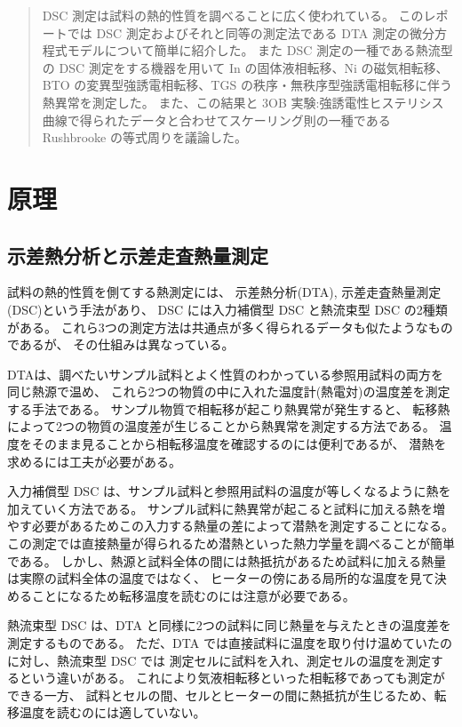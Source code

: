 \documentclass[9pt,dvipdfmx,a4paper]{jsarticle}
\begin{document}

\begin{abstract}
    DSC 測定は試料の熱的性質を調べることに広く使われている。
    このレポートでは DSC 測定およびそれと同等の測定法である DTA 測定の微分方程式モデルについて簡単に紹介した。
    また DSC 測定の一種である熱流型の DSC 測定をする機器を用いて In の固体液相転移、Ni の磁気相転移、
    BTO の変異型強誘電相転移、TGS の秩序・無秩序型強誘電相転移に伴う熱異常を測定した。
    また、この結果と 3OB 実験:強誘電性ヒステリシス曲線で得られたデータと合わせてスケーリング則の一種である Rushbrooke の等式周りを議論した。
\end{abstract}


\section{原理}
\subsection{示差熱分析と示差走査熱量測定}
試料の熱的性質を側てする熱測定には、
示差熱分析(DTA), 示差走査熱量測定(DSC)という手法があり、
DSC には入力補償型 DSC と熱流束型 DSC の2種類がある。
これら3つの測定方法は共通点が多く得られるデータも似たようなものであるが、
その仕組みは異なっている。

DTAは、調べたいサンプル試料とよく性質のわかっている参照用試料の両方を同じ熱源で温め、
これら2つの物質の中に入れた温度計(熱電対)の温度差を測定する手法である。
サンプル物質で相転移が起こり熱異常が発生すると、
転移熱によって2つの物質の温度差が生じることから熱異常を測定する方法である。
温度をそのまま見ることから相転移温度を確認するのには便利であるが、
潜熱を求めるには工夫が必要がある。

入力補償型 DSC は、サンプル試料と参照用試料の温度が等しくなるように熱を加えていく方法である。
サンプル試料に熱異常が起こると試料に加える熱を増やす必要があるためこの入力する熱量の差によって潜熱を測定することになる。
この測定では直接熱量が得られるため潜熱といった熱力学量を調べることが簡単である。
しかし、熱源と試料全体の間には熱抵抗があるため試料に加える熱量は実際の試料全体の温度ではなく、
ヒーターの傍にある局所的な温度を見て決めることになるため転移温度を読むのには注意が必要である。

熱流束型 DSC は、DTA と同様に2つの試料に同じ熱量を与えたときの温度差を測定するものである。
ただ、DTA では直接試料に温度を取り付け温めていたのに対し、熱流束型 DSC では
測定セルに試料を入れ、測定セルの温度を測定するという違いがある。
これにより気液相転移といった相転移であっても測定ができる一方、
試料とセルの間、セルとヒーターの間に熱抵抗が生じるため、転移温度を読むのには適していない。
\end{document}
